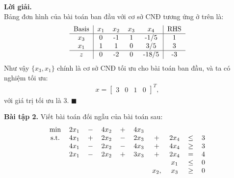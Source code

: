 \documentclass[12pt]{article}
\newenvironment{solution}{%
     \setlength\parindent{0pt}\par\medskip\textbf{Lời giải.}\quad}{%
     \hfill\tiny$\blacksquare$\par\medskip}
\begin{document}
\begin{solution}
        \\
        Bảng đơn hình của bài toán ban đầu với cơ sở CNĐ tương ứng ở trên là:
        \begin{align*}
            \begin{tabular}{c|cccc|cc}
                \text{Basis} & $x_1$ & $x_2$ & $x_3$ & $x_4$ & RHS \\ \hline
                $x_3$ & 0 & -1 & 1 & -1/5 & 1 \\
                $x_1$ & 1 & 1 & 0 & 3/5 & 3 \\ \hline
                $z$ & 0 & -2 & 0 & -18/5 & -3 \\
            \end{tabular}
        \end{align*}
        Như vậy $\{x_3, x_1\}$ chính là cơ sở CNĐ tối ưu cho bài toán ban đầu, và ta có nghiệm tối ưu:
        \begin{align*}
            x = \begin{bmatrix}
                3 & 0 & 1 & 0
            \end{bmatrix}^T,
        \end{align*}
        với giá trị tối ưu là 3.
    \end{solution}
    \textbf{Bài tập 2.} Viết bài toán đối ngẫu của bài toán sau:
    \begin{align*}
        \begin{tabular}{cccccccccc}
            \text{min} & $2x_1$ & $-$ & $4x_2$ & $+$ & $4x_3$ \\
            \text{s.t.} & $4x_1$ & $+$ & $2x_2$ & $-$ & $2x_3$ & $+$ & $2x_4$ & $\leq$ & 3 \\
            & $4x_1$ & $-$ & $2x_2$ & $-$ & $4x_3$ & $+$ & $4x_4$ & $\geq$ & 3 \\
            & $2x_1$ & $-$ & $2x_2$ & $+$ & $3x_3$ & $+$ & $2x_4$ & $=$ & 4 \\
            & & & & & & & $x_1$ & $\leq$ & 0\\
            & & & & & & $x_2,$ & $x_3$ & $\geq$ & 0\\
        \end{tabular}
    \end{align*}
    
    
    
\end{document}
